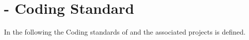 
\section{\MBSim{} - Coding Standard}
In the following the Coding standards of \MBSim{} and the associated projects is defined.
